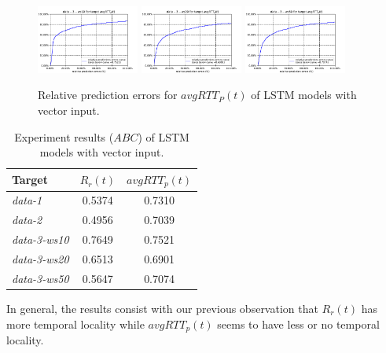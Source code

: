 \documentclass[sigconf]{acmart}
\begin{document}
	\begin{figure} 	
	\includegraphics[width=0.3\textwidth]{fig4/data-3-ws10-task-3-7030-lstm.pdf}
	\includegraphics[width=0.3\textwidth]{fig4/data-3-ws20-task-3-7030-lstm.pdf}
	\includegraphics[width=0.3\textwidth]{fig4/data-3-ws50-task-3-7030-lstm.pdf}
	\caption{Relative prediction errors for  $avgRTT_P(t)$ of LSTM models with vector input.}
	\label{fig:lstm-task3-vector}
	\end{figure}
	\begin{table}[tbp]
		\centering
		\begin{tabular}{lcc}
			\toprule
			{Target} &{$R_r(t)$}&{$avgRTT_p(t)$} \\
			\midrule
			\textit{data-1}& 0.5374 & 0.7310 \\
			\textit{data-2}& 0.4956& 0.7039     \\
			\textit{data-3-ws10}& 0.7649 & 0.7521 \\
			\textit{data-3-ws20}& 0.6513& 0.6901    \\
			\textit{data-3-ws50}& 0.5647& 0.7074  \\
			\bottomrule	
		\end{tabular}
		\caption{ Experiment results ($ABC$) of LSTM models with vector input. }
		\label{tab:lstm-vector}
	\end{table}
	
	In general, the results consist with our previous observation that $R_r(t)$ has more temporal locality while $avgRTT_p(t)$ seems to have less or no temporal locality.
	
\end{document}
